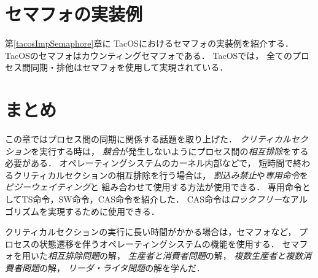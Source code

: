 \section{セマフォの実装例}
第\ref{tacosImpSemaphore}章に
TacOSにおけるセマフォの実装例を紹介する．
TacOSのセマフォはカウンティングセマフォである．
TacOSでは，
全てのプロセス間同期・排他はセマフォを使用して実現されている．

\section{まとめ}
この章ではプロセス間の同期に関係する話題を取り上げた．
\emph{クリティカルセクション}を実行する時は，
\emph{競合}が発生しないようにプロセス間の\emph{相互排除}をする必要がある．
オペレーティングシステムのカーネル内部などで，
短時間で終わるクリティカルセクションの相互排除を行う場合は，
\emph{割込み禁止}や\emph{専用命令}を\emph{ビジーウェイティング}と
組み合わせて使用する方法が使用できる．
専用命令としてTS命令，SW命令，CAS命令を紹介した．
CAS命令は\emph{ロックフリー}なアルゴリズムを実現するために使用できる．

クリティカルセクションの実行に長い時間がかかる場合は，セマフォなど，
プロセスの状態遷移を伴うオペレーティングシステムの機能を使用する．
セマフォを用いた\emph{相互排除問題}の解，
\emph{生産者と消費者問題}の解，
\emph{複数生産者と複数消費者問題}の解，
\emph{リーダ・ライタ問題}の解を学んだ．


